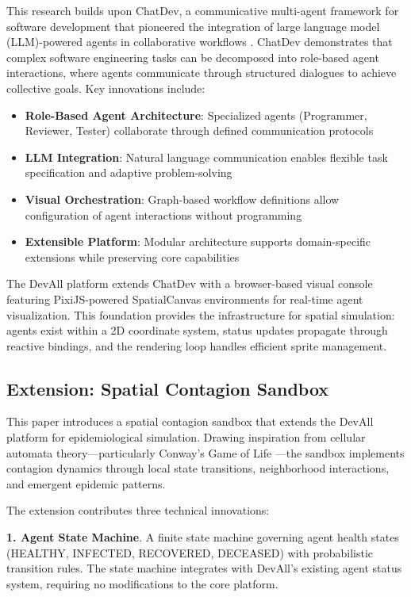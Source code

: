 This research builds upon ChatDev, a communicative multi-agent framework for software development that pioneered the integration of large language model (LLM)-powered agents in collaborative workflows \cite{qian2023communicative}. ChatDev demonstrates that complex software engineering tasks can be decomposed into role-based agent interactions, where agents communicate through structured dialogues to achieve collective goals. Key innovations include:

\begin{itemize}
    \item \textbf{Role-Based Agent Architecture}: Specialized agents (Programmer, Reviewer, Tester) collaborate through defined communication protocols
    \item \textbf{LLM Integration}: Natural language communication enables flexible task specification and adaptive problem-solving
    \item \textbf{Visual Orchestration}: Graph-based workflow definitions allow configuration of agent interactions without programming
    \item \textbf{Extensible Platform}: Modular architecture supports domain-specific extensions while preserving core capabilities
\end{itemize}

The DevAll platform extends ChatDev with a browser-based visual console featuring PixiJS-powered SpatialCanvas environments for real-time agent visualization. This foundation provides the infrastructure for spatial simulation: agents exist within a 2D coordinate system, status updates propagate through reactive bindings, and the rendering loop handles efficient sprite management.

\subsection{Extension: Spatial Contagion Sandbox}

This paper introduces a spatial contagion sandbox that extends the DevAll platform for epidemiological simulation. Drawing inspiration from cellular automata theory---particularly Conway's Game of Life \cite{gardner1970mathematical}---the sandbox implements contagion dynamics through local state transitions, neighborhood interactions, and emergent epidemic patterns.

The extension contributes three technical innovations:

\textbf{1. Agent State Machine}. A finite state machine governing agent health states (HEALTHY, INFECTED, RECOVERED, DECEASED) with probabilistic transition rules. The state machine integrates with DevAll's existing agent status system, requiring no modifications to the core platform.

